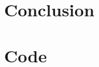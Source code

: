 \documentclass[12pt]{article} %
\begin{document}





\section{Conclusion} %

\lipsum[12-13]





\appendix

\section{Code}


\printindex

\end{document}

